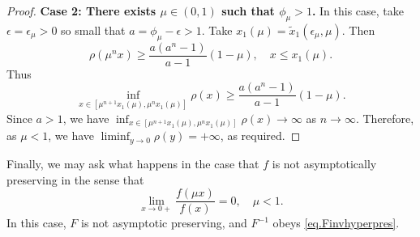 \documentclass[a4paper,10pt,reqno]{amsart}
\numberwithin{equation}{section}
\theoremstyle{definition}
\theoremstyle{remark}
\DeclareMathOperator{\1}{\mathbbm 1}
\begin{document}
\begin{proof}
		\textbf{Case 2: There exists $\mu\in (0,1)$ such that $\phi_\mu>1$.} 
		In this case, take $\epsilon=\epsilon_\mu>0$ so small that $a=\phi_\mu-\epsilon>1$. Take $x_1(\mu)=\tilde{x}_1(\epsilon_\mu,\mu)$. 
		Then 
		\[
		\rho(\mu^n x) \geq \frac{a(a^n-1)}{a-1} (1-\mu), \quad x\leq x_1(\mu).
		\]
		Thus 
		\[
		\inf_{x\in[\mu^{n+1}x_1(\mu),\mu^n x_1(\mu)]} \rho(x)
		\geq \frac{a(a^n-1)}{a-1} (1-\mu).
		\]
		Since $a>1$, we have $\inf_{x\in[\mu^{n+1}x_1(\mu),\mu^n x_1(\mu)]} \rho(x)\to\infty$ as $n\to\infty$. Therefore, as $\mu<1$, we have 
		$\liminf_{y\to 0} \rho(y)=+\infty$, as required. 
	\end{proof}
	
	Finally, we may ask what happens in the case that $f$ is not asymptotically preserving in the sense that 
	\begin{equation} \label{eq.fnotap}
		\lim_{x\to 0+} \frac{f(\mu x)}{f(x)}=0, \quad \mu<1.
	\end{equation}
	In this case, $F$ is not asymptotic preserving, and $F^{-1}$ obeys \eqref{eq.Finvhyperpres}. 
	
\end{document}
